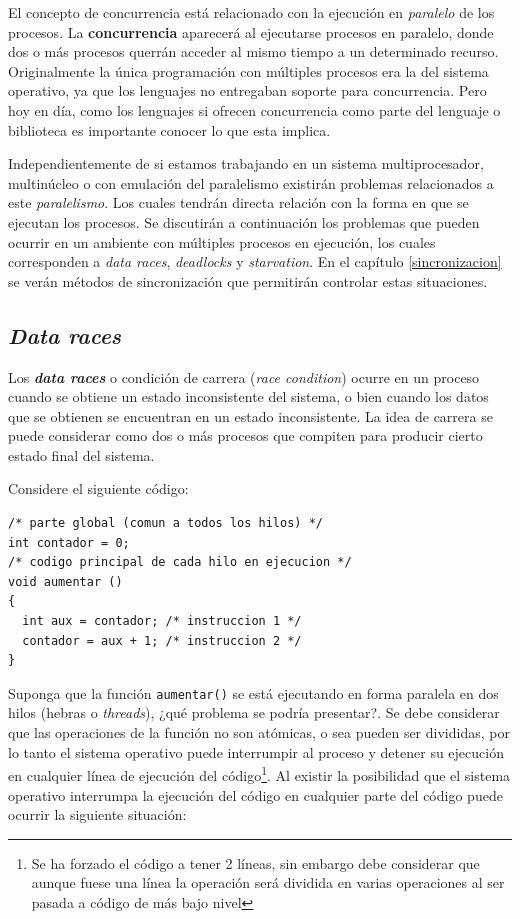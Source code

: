 El concepto de concurrencia está relacionado con la ejecución en
\textit{paralelo} de los procesos. La \textbf{concurrencia} aparecerá al
ejecutarse procesos en paralelo, donde dos o más procesos querrán acceder al
mismo tiempo a un determinado recurso. Originalmente la única programación con
múltiples procesos era la del sistema operativo, ya que los lenguajes no
entregaban soporte para concurrencia. Pero hoy en día, como los lenguajes si
ofrecen concurrencia como parte del lenguaje o biblioteca es importante conocer
lo que esta implica.

Independientemente de si estamos trabajando en un sistema multiprocesador,
multinúcleo o con emulación del paralelismo existirán problemas relacionados a
este \textit{paralelismo}. Los cuales tendrán directa relación con la forma en
que se ejecutan los procesos. Se discutirán a continuación los problemas que
pueden ocurrir en un ambiente con múltiples procesos en ejecución, los cuales
corresponden a \textit{data races}, \textit{deadlocks} y \textit{starvation}. En
el capítulo \ref{sincronizacion} se verán métodos de sincronización que
permitirán controlar estas situaciones.

\subsection{\textit{Data races}}
Los \textbf{\textit{data races}} o condición de carrera (\textit{race
condition}) ocurre en un proceso cuando se obtiene un estado inconsistente del
sistema, o bien cuando los datos que se obtienen se encuentran en un estado
inconsistente. La idea de carrera se puede considerar como dos o más procesos
que compiten para producir cierto estado final del sistema.

Considere el siguiente código:
\begin{lstlisting}
/* parte global (comun a todos los hilos) */
int contador = 0;
/* codigo principal de cada hilo en ejecucion */
void aumentar ()
{
  int aux = contador; /* instruccion 1 */
  contador = aux + 1; /* instruccion 2 */
}
\end{lstlisting}

Suponga que la función \texttt{aumentar()} se está ejecutando en forma
paralela en dos hilos (hebras o \textit{threads}), ¿qué problema se podría
presentar?. Se debe considerar que las operaciones de la función no son
atómicas, o sea pueden ser divididas, por lo tanto el sistema operativo puede
interrumpir al proceso y detener su ejecución en cualquier línea de ejecución
del código\footnote{Se ha forzado el código a tener 2 líneas, sin embargo debe
considerar que aunque fuese una línea la operación será dividida en varias
operaciones al ser pasada a código de más bajo nivel}. Al existir la posibilidad
que el sistema operativo interrumpa la ejecución del código en cualquier parte
del código puede ocurrir la siguiente situación:


